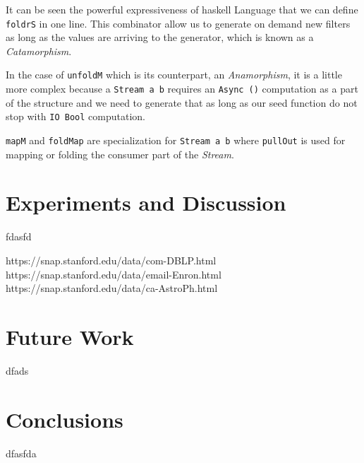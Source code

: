 \documentclass[12pt]{article}
\begin{document}
It can be seen the powerful expressiveness of \acrshort{haskell} Language that we can define \texttt{foldrS} in one line. This combinator
allow us to generate on demand new filters as long as the values are arriving to the generator, which is known as a \textit{Catamorphism}.

In the case of \texttt{unfoldM} which is its counterpart, an \textit{Anamorphism}, it is a little more complex because a \texttt{Stream a b} 
requires an \texttt{Async ()} computation as a part of the structure and we need to generate that as long as our seed function do not stop with \texttt{IO Bool} computation.

\texttt{mapM} and \texttt{foldMap} are specialization for \texttt{Stream a b} where \texttt{pullOut} is used for mapping or folding
the consumer part of the \textit{Stream}.

\section{Experiments and Discussion}
fdasfd

https://snap.stanford.edu/data/com-DBLP.html
https://snap.stanford.edu/data/email-Enron.html
https://snap.stanford.edu/data/ca-AstroPh.html




\section{Future Work}
dfads

\section{Conclusions}
dfasfda

\clearpage

\printglossary[type=\acronymtype]

\printglossary




\appendix
\end{document}
